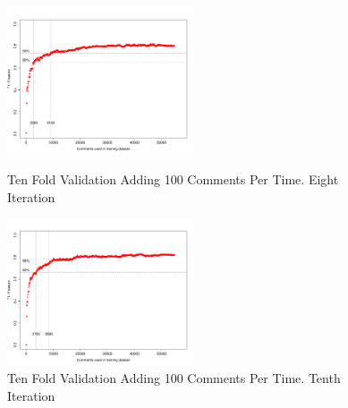 \begin{figure}[thb!]
  \centering
  \vspace{-93mm}
  \includegraphics[width=0.49\textwidth]{figures/appendix/ten_fold_validation_design/ten_fold_validation_7_100.pdf}
  \vspace{-5mm}
  \caption{Ten Fold Validation Adding 100 Comments Per Time. Eight Iteration}
  \label{fig:design_ten_fold_validation_7_100}
  \includegraphics[width=0.49\textwidth]{figures/appendix/ten_fold_validation_design/ten_fold_validation_9_100.pdf}
  \vspace{-5mm}
  \caption{Ten Fold Validation Adding 100 Comments Per Time. Tenth Iteration}
  \label{fig:design_ten_fold_validation_9_100}
  
\end{figure}

